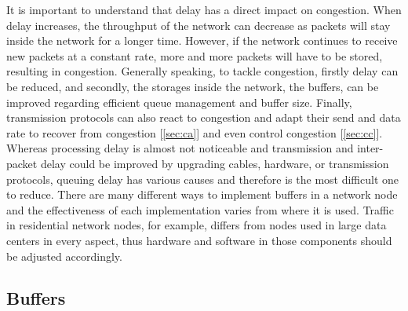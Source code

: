 \documentclass[a4paper,conference]{IEEEtran}
\begin{document}
It is important to understand that delay has a direct impact on congestion. When delay increases, the throughput of the network can decrease as packets will stay inside the network for a longer time. However, if the network continues to receive new packets at a constant rate, more and more packets will have to be stored, resulting in congestion. Generally speaking, to tackle congestion, firstly delay can be reduced, and secondly, the storages inside the network, the buffers, can be improved regarding efficient queue management and buffer size. Finally, transmission protocols can also react to congestion and adapt their send and data rate to recover from congestion [\autoref{sec:ca}] and even control congestion [\autoref{sec:cc}].
\\Whereas processing delay is almost not noticeable and transmission and inter-packet delay could be improved by upgrading cables, hardware, or transmission protocols, queuing delay has various causes and therefore is the  most difficult one to reduce. There are many different ways to implement buffers in a network node and the effectiveness of each implementation varies from where it is used. Traffic in residential network nodes, for example, differs from nodes used in large data centers in every aspect, thus hardware and software in those components should be adjusted accordingly.

\subsection{Buffers}
\label{sec:buffers}
\end{document}

